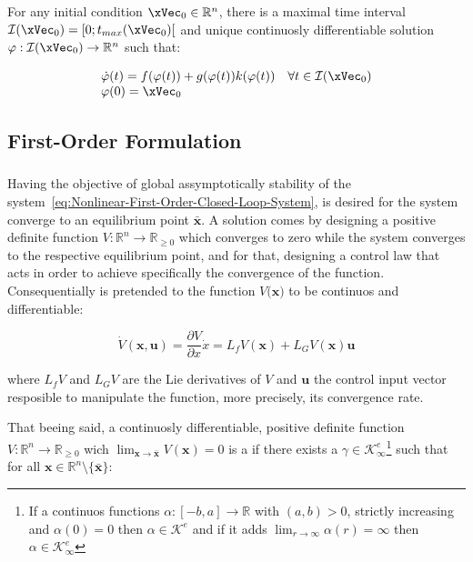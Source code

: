 For any initial condition \(\xVec_0 \in \mathbb{R}^n\), there is a maximal time interval \(\mathcal{I}(\xVec_0) = [0; t_{max}(\xVec_0)[ \) and unique continuosly differentiable solution \(\varphi: \mathcal{I}(\xVec_0) \to \mathbb{R}^n \) such that:

\begin{equation}
    \begin{array}{l}
        \dot{\varphi}(t) = f(\varphi(t))+ g(\varphi(t))k(\varphi(t)) \quad \forall t \in \mathcal{I}(\xVec_0)  \\
        \varphi(0) = \xVec_0
    \end{array}
 \label{eq:Nonlinear-First-Order-Closed-Loop-System-UniqueSol}
\end{equation}


\subsection{First-Order Formulation}
\label{sub:formulation}

\subsubsection{}
\label{subsub:control_lyapunov_function}

Having the objective of global assymptotically stability of the system~\ref{eq:Nonlinear-First-Order-Closed-Loop-System}, is desired for the system converge to an equilibrium point \( \bar{\mathbf{x}} \). A solution comes by designing a positive definite function \( V: \mathbb{R}^n \rightarrow \mathbb{R}_{\geq 0} \) which converges to zero while the system converges to the respective equilibrium point, and for that, designing a control law that acts in order to achieve specifically the convergence of the function. Consequentially is pretended to the function \( V\mathbf(\mathbf{x}) \) to be continuos and differentiable:

\[\dot{V} (\mathbf{x}, \mathbf{u}) = \frac{\partial V}{\partial x}\dot{x} = L_fV(\mathbf{x}) + L_GV(\mathbf{x})\mathbf{u} \]

where \(L_fV\) and \(L_GV\) are the Lie derivatives of \(V\) and \(\mathbf{u}\) the control input vector resposible to manipulate the function, more precisely, its convergence rate.\par

That beeing said, a continuosly differentiable, positive definite function \( V: \mathbb{R}^n \rightarrow \mathbb{R}_{\geq 0}  \) wich \( \lim_{\mathbf{x} \to \bar{\mathbf{x}}}{V(\mathbf{x})} = 0 \) is a  if there exists a \( \gamma \in \mathcal{K}^e_{\infty}  \)\footnote{If a continuos functions \(\alpha:[-b,a] \to \mathbb{R}\) with \((a,b) > 0\), strictly increasing and \(\alpha(0) = 0\) then \(\alpha \in \mathcal{K}^e\) and if it adds \(\lim_{r \to \infty} \alpha(r) = \infty\) then \(\alpha \in \mathcal{K}^e_{\infty}\)}  such that for all \( \mathbf{x} \in \mathbb{R}^n \setminus \{\bar{\mathbf{x}}\} \):

